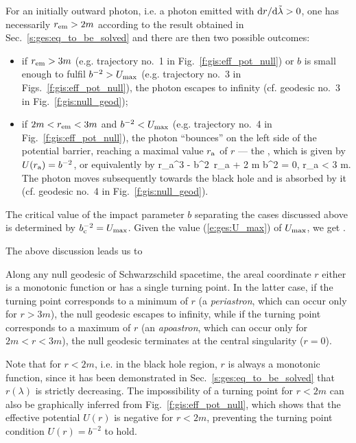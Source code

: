 For an initially outward photon, i.e. a photon emitted with ${\mathrm{d} r}/{\mathrm{d}\tilde{\lambda}} > 0$,
one has necessarily $r_{\rm em}>2m$ according to the result obtained in Sec.~\ref{s:ges:eq_to_be_solved}
and there are then two possible outcomes:

\begin{itemize}
\item if $r_{\rm em} > 3 m$ (e.g. trajectory
no.~1 in Fig.~\ref{f:gis:eff_pot_null}) or
$b$ is small enough to fulfil $b^{-2} > U_{\rm max}$ (e.g. trajectory
no.~3 in Figs.~\ref{f:gis:eff_pot_null}), the photon escapes to infinity
(cf. geodesic no.~3 in Fig.~\ref{f:gis:null_geod});
\item if $2m < r_{\rm em} < 3 m$ and $b^{-2} < U_{\rm max}$ (e.g. trajectory
no.~4 in Fig.~\ref{f:gis:eff_pot_null}), the photon ``bounces'' on the left
side of the potential barrier, reaching a maximal value $r_{\rm a}$ of $r$
--- the ,
which is given by  $U(r_{\rm a}) = b^{-2}$, or equivalently by
\be \label{e:ges:r_apo_null}
   r_{\rm a}^3 - b^2\, r_{\rm a} + 2 m b^2 = 0, \quad r_{\rm a} < 3 m.
\ee
The photon moves subsequently towards the black hole and
is absorbed by it (cf. geodesic no.~4 in Fig.~\ref{f:gis:null_geod}).
\end{itemize}

The critical value of the impact parameter $b$ separating the cases discussed
above is determined by $b_{\rm c}^{-2} = U_{\rm max}$.
Given the value (\ref{e:ges:U_max}) of $U_{\rm max}$, we get
\be \label{e:ges:b_crit}
    .
\ee

The above discussion leads us to
\begin{prop}
Along any null geodesic of Schwarzschild spacetime, the areal coordinate $r$
either is a monotonic function or has a single turning point. In the latter case,
if the turning point corresponds to a minimum of $r$ (a \emph{periastron}, which can occur
only for $r>3m$), the null geodesic escapes to infinity, while if the turning
point corresponds to a maximum of $r$ (an \emph{apoastron}, which can occur only for $2m<r<3m$), the
null geodesic terminates at the central singularity ($r=0$).
\end{prop}
Note that for $r<2m$, i.e. in the black hole region, $r$
is always a monotonic function, since it has been demonstrated in
Sec.~\ref{s:ges:eq_to_be_solved} that $r(\lambda)$ is strictly
decreasing. The impossibility of a turning point for $r<2m$ can also be
graphically inferred from Fig.~\ref{f:gis:eff_pot_null}, which shows
that the effective potential $U(r)$ is negative for $r<2m$,
preventing the turning point condition $U(r) = b^{-2}$ to hold.


